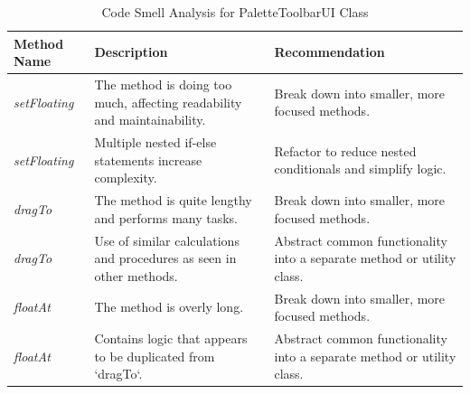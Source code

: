 \begin{table}[H]
    \centering
    \begin{tabular}{|l|p{6cm}|p{6cm}|}
        \hline
        \textbf{Method Name} & \textbf{Description}                                                     & \textbf{Recommendation}                                                \\ \hline
        \textit{setFloating} & The method is doing too much, affecting readability and maintainability. & Break down into smaller, more focused methods.                         \\ \hline
        \textit{setFloating} & Multiple nested if-else statements increase complexity.                  & Refactor to reduce nested conditionals and simplify logic.             \\ \hline
        \textit{dragTo}      & The method is quite lengthy and performs many tasks.                     & Break down into smaller, more focused methods.                         \\ \hline
        \textit{dragTo}      & Use of similar calculations and procedures as seen in other methods.     & Abstract common functionality into a separate method or utility class. \\ \hline
        \textit{floatAt}     & The method is overly long.                                               & Break down into smaller, more focused methods.                         \\ \hline
        \textit{floatAt}     & Contains logic that appears to be duplicated from `dragTo`.              & Abstract common functionality into a separate method or utility class. \\ \hline
    \end{tabular}
    \caption{Code Smell Analysis for PaletteToolbarUI Class}
    \label{table:codesmell-palette}
\end{table}






